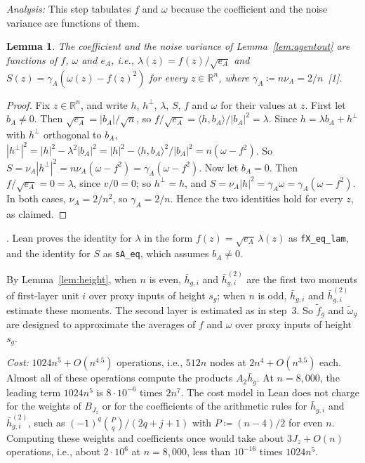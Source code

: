 \documentclass[10pt]{article}
\newcommand{\leanmark}[1]{{\relscale{0.78}\color{gray}[#1]}}
\newenvironment{leanitems}{\par\smallskip\relscale{0.78}\color{gray}\hypersetup{urlcolor=gray}\raggedright%
  \begin{list}{}{\setlength{\leftmargin}{2em}\setlength{\labelwidth}{1.6em}%
  \setlength{\labelsep}{0.4em}\setlength{\itemsep}{0pt}\setlength{\topsep}{0pt}%
  \setlength{\parsep}{0pt}}}{\end{list}\par\medskip}
\newtheorem{lemma}{Lemma}
\newcommand{\RR}{\mathbb{R}}
\begin{document}
\begin{enumerate}[leftmargin=*,itemsep=8pt,topsep=10pt plus 2pt]
  \emph{Analysis:} This step tabulates $f$ and $\omega$ because the
  coefficient and the noise variance are functions of them.
  \begin{lemma}\label{lem:fomega}
    The coefficient and the noise variance of Lemma~\ref{lem:agentout} are
    functions of $f$, $\omega$ and $e_A$, i.e.,
    $\lambda(z)=f(z)/\sqrt{e_A}$ and $S(z)=\gamma_A(\omega(z)-f(z)^2)$ for
    every $z\in\RR^n$, where $\gamma_A\coloneqq n\nu_A=2/n$~\leanmark{1}.
  \end{lemma}
  \begin{proof}
  Fix $z\in\RR^n$, and write $h$, $h^\perp$, $\lambda$, $S$, $f$ and $\omega$
  for their values at $z$. First let $b_A\ne0$. Then
  $\sqrt{e_A}=|b_A|/\sqrt n$, so
  $f/\sqrt{e_A}=\langle h,b_A\rangle/|b_A|^2=\lambda$. Since
  $h=\lambda b_A+h^\perp$ with $h^\perp$ orthogonal to $b_A$,
  $|h^\perp|^2=|h|^2-\lambda^2|b_A|^2
  =|h|^2-\langle h,b_A\rangle^2/|b_A|^2=n(\omega-f^2)$. So
  $S=\nu_A|h^\perp|^2=n\nu_A(\omega-f^2)=\gamma_A(\omega-f^2)$. Now let
  $b_A=0$. Then $f/\sqrt{e_A}=0=\lambda$, since $v/0=0$; so $h^\perp=h$, and
  $S=\nu_A|h|^2=\gamma_A\omega=\gamma_A(\omega-f^2)$. In both cases,
  $\nu_A=2/n^2$, so $\gamma_A=2/n$. Hence the two identities hold for every
  $z$, as claimed.
  \end{proof}
  \begin{leanitems}
  . Lean proves the identity for
  $\lambda$ in the form $f(z)=\sqrt{e_A}\,\lambda(z)$ as \texttt{fX\_eq\_lam},
  and the identity for $S$ as \texttt{sA\_eq}, which assumes $b_A\ne0$.
  \end{leanitems}
  By
  Lemma~\ref{lem:height}, when $n$ is even, $\bar h_{g,i}$ and
  $\bar h^{(2)}_{g,i}$ are the first two moments of first-layer unit $i$ over
  proxy inputs of height $s_g$; when $n$ is odd, $\bar h_{g,i}$ and $\bar h^{(2)}_{g,i}$ estimate these moments.
  The second layer is estimated as in step~3.
  So $\tilde f_g$ and $\tilde\omega_g$ are designed to approximate the averages
  of $f$ and $\omega$ over proxy inputs of height $s_g$.

  \emph{Cost:} $1024n^5+O(n^{4.5})$ operations, i.e., $512n$ nodes at
  $2n^4+O(n^{3.5})$ each. Almost all of these operations compute the products $A_2\bar h_g$. At
  $n=8{,}000$, the leading term $1024n^5$ is $8\cdot10^{-6}$ times $2n^7$.
  The cost model in Lean does not charge for the weights of $B_{J_z}$ or for
  the coefficients of the arithmetic rules for $\bar h_{g,i}$ and
  $\bar h^{(2)}_{g,i}$, such as $(-1)^q\binom Pq/(2q+j+1)$ with
  $P\coloneqq (n-4)/2$ for even $n$. Computing these weights and coefficients once would take about
  $3J_z+O(n)$ operations, i.e., about $2\cdot10^6$ at $n=8{,}000$, less than
  $10^{-16}$ times $1024n^5$.


\end{enumerate}
\end{document}
